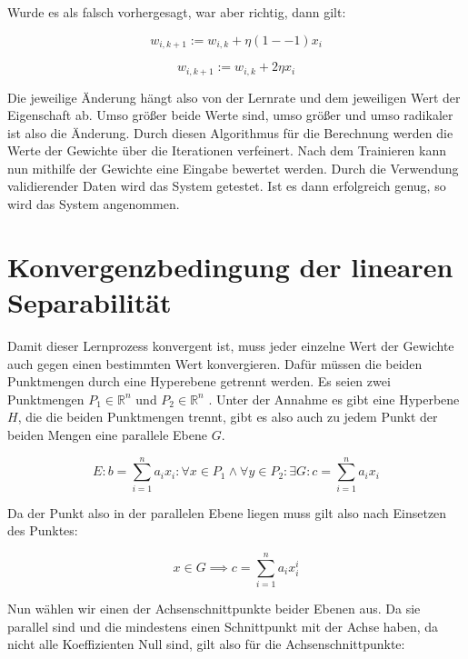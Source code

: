 \documentclass[11pt]{article} %
\begin{document}
Wurde es als falsch vorhergesagt, war aber richtig, dann gilt:

\begin{equation}
w_{i, k+1} := w_{i, k} + \eta ( 1 - -1 ) x_{i}
\end{equation}

\begin{equation}
w_{i, k+1} := w_{i, k} + 2 \eta x_{i}
\end{equation}

Die jeweilige Änderung hängt also von der Lernrate und dem jeweiligen Wert der Eigenschaft ab. Umso größer beide Werte sind, umso größer
und umso radikaler ist also die Änderung. Durch diesen Algorithmus für die Berechnung werden die Werte der Gewichte über die Iterationen
verfeinert. Nach dem Trainieren kann nun mithilfe der Gewichte eine Eingabe bewertet werden. Durch die Verwendung validierender Daten wird das System getestet. Ist es dann erfolgreich genug, so wird das System angenommen.

\section{Konvergenzbedingung der linearen Separabilität}

Damit dieser Lernprozess konvergent ist, muss jeder einzelne Wert  der Gewichte auch gegen einen bestimmten Wert konvergieren. Dafür müssen die beiden Punktmengen durch eine Hyperebene getrennt werden. 
Es seien zwei Punktmengen $P_{1} \in \mathbb{R}^{n}$ und  $P_{2} \in \mathbb{R}^{n}$ . Unter der Annahme es gibt eine Hyperbene
$H$, die die beiden Punktmengen trennt, gibt es also auch zu jedem Punkt der beiden Mengen eine parallele Ebene $G$.

\begin{equation}
E: b = \sum^{n}_{i=1} a_{i} x_{i} : \forall x \in P_{1} \wedge \forall y \in P_{2} : \exists G : c =  \sum^{n}_{i=1} a_{i} x_{i}
\end{equation}

Da der Punkt also in der parallelen Ebene liegen muss gilt also nach Einsetzen des Punktes:

\begin{equation}
x \in G \implies c =  \sum^{n}_{i=1} a_{i} x_{i}^{i}
\end{equation}

Nun wählen wir einen der Achsenschnittpunkte beider Ebenen aus. Da sie parallel sind und die mindestens einen Schnittpunkt mit der Achse haben, da nicht alle Koeffizienten Null sind, gilt also für die Achsenschnittpunkte:
\end{document}
